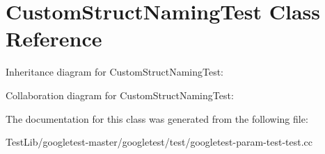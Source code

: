 \hypertarget{classCustomStructNamingTest}{}\section{Custom\+Struct\+Naming\+Test Class Reference}
\label{classCustomStructNamingTest}


Inheritance diagram for Custom\+Struct\+Naming\+Test\+:


Collaboration diagram for Custom\+Struct\+Naming\+Test\+:


The documentation for this class was generated from the following file\+:\begin{DoxyCompactItemize}
\item 
Test\+Lib/googletest-\/master/googletest/test/googletest-\/param-\/test-\/test.\+cc\end{DoxyCompactItemize}
